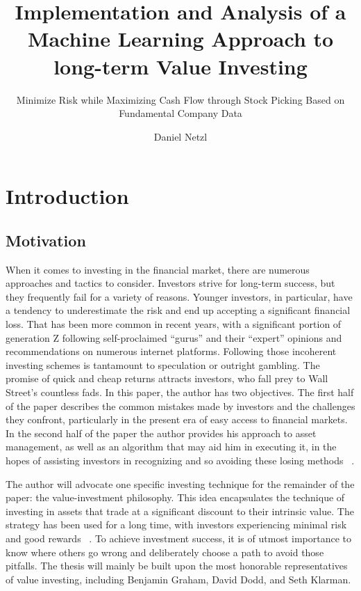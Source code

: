 \documentclass{imc-inf}
\title{Implementation and Analysis of a Machine Learning Approach to long-term Value Investing}
\subtitle{Minimize Risk while Maximizing Cash Flow through Stock Picking Based on Fundamental Company Data}
\author{Daniel Netzl}
\begin{document}
\frontmatter\maketitle{}


\begin{declarations}\end{declarations}


%
\tableofcontents%
\clearpage




%
\listoffigures
\clearpage


\mainmatter%

\chapter{Introduction}\label{chap:introduction}

\section{Motivation}%
When it comes to investing in the financial market, there are numerous approaches and tactics to consider. Investors strive for long-term success, but they frequently fail for a variety of reasons. Younger investors, in particular, have a tendency to underestimate the risk and end up accepting a significant financial loss. That has been more common in recent years, with a significant portion of generation Z following self-proclaimed “gurus” and their “expert” opinions and recommendations on numerous internet platforms. Following those incoherent investing schemes is tantamount to speculation or outright gambling. The promise of quick and cheap returns attracts investors, who fall prey to Wall Street's countless fads. In this paper, the author has two objectives. The first half of the paper describes the common mistakes made by investors and the challenges they confront, particularly in the present era of easy access to financial markets. In the second half of the paper the author provides his approach to asset management, as well as an algorithm that may aid him in executing it, in the hopes of assisting investors in recognizing and so avoiding these losing methods ~\cite{margin_of_safety}.

The author will advocate one specific investing technique for the remainder of the paper: the value-investment philosophy. This idea encapsulates the technique of investing in assets that trade at a significant discount to their intrinsic value. The strategy has been used for a long time, with investors experiencing minimal risk and good rewards ~\cite{margin_of_safety}.
To achieve investment success, it is of utmost importance to know where others go wrong and deliberately choose a path to avoid those pitfalls. The thesis will mainly be built upon the most honorable representatives of value investing, including Benjamin Graham, David Dodd, and Seth Klarman. 
\end{document}
